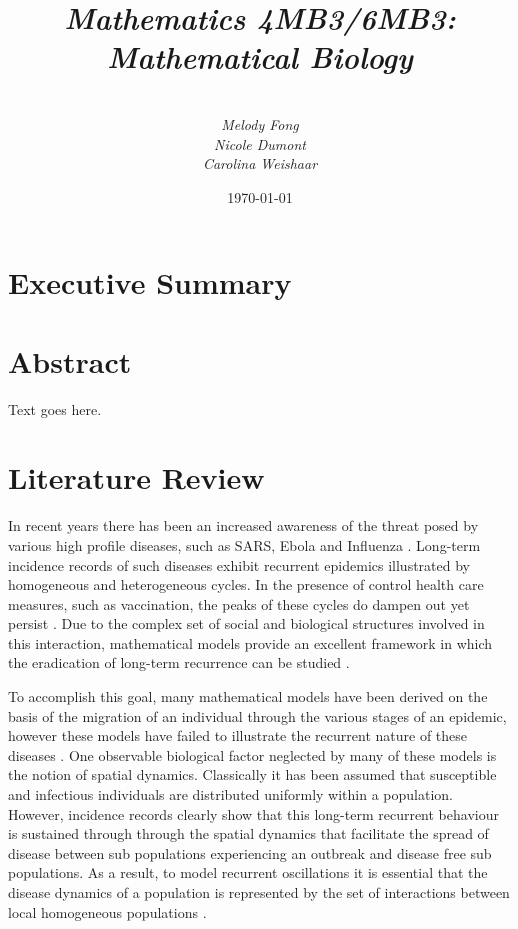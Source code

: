 \documentclass[twocolumn,nofootinbib,showkeys,twoside,floatfix,unsortedaddress,flushbottom,10pt,aps,pra]{report}
\author{\sc{Model Students:}\\
 \small \emph{Melody Fong} \\
 \small \emph{Nicole Dumont} \\
 \small  \emph{Carolina Weishaar}}
\title{ \small \emph{Mathematics 4MB3/6MB3: Mathematical Biology }\\
  \Huge \sc{Spatial Epidemics Dynamics:\\ Synchronization}}
\date{\today}
\begin{document}
\pagestyle{fancy}

\maketitle
\tableofcontents

\onecolumn
\section*{\Huge Executive Summary}
%
\lipsum[34]

\twocolumn

\section{Abstract} Text goes here.
\section{Literature Review }
In recent years there has been an increased awareness of the threat posed by various high profile diseases, such as SARS, Ebola and Influenza \cite{Liu2009}. Long-term incidence records of such diseases exhibit recurrent epidemics illustrated by homogeneous and heterogeneous cycles. In the presence of control health care measures, such as vaccination, the peaks of these cycles do dampen out yet persist \cite{Lloyd1996}. Due to the complex set of social and biological structures involved in this interaction, mathematical models provide an excellent framework in which the eradication of long-term recurrence can be studied \cite{Sattenspiel2009}. \par

To accomplish this goal, many mathematical models have been derived on the basis of the migration of an individual through the various stages of an epidemic, however these models have failed to illustrate the recurrent nature of these diseases \cite{Lloyd2004}. One observable biological factor neglected by many of these models is the notion of spatial dynamics. Classically it has been assumed that susceptible and infectious individuals are distributed uniformly within a population. However, incidence records clearly show that this long-term recurrent behaviour is sustained through through the spatial dynamics that facilitate the spread of disease between sub populations experiencing an outbreak and disease free sub populations. As a result, to model recurrent oscillations it is essential that the disease dynamics of a  population is represented by the set of interactions between local homogeneous populations \cite{Earn2000}.\par
\end{document}
